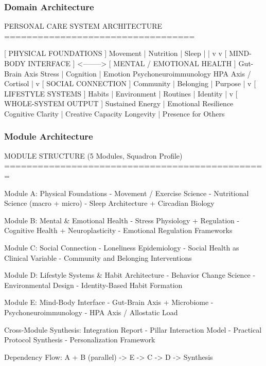 \documentclass[11pt,letterpaper]{article}
\begin{document}
\subsubsection{Domain Architecture}

\begin{asciibox}
PERSONAL CARE SYSTEM ARCHITECTURE
==================================

        [ PHYSICAL FOUNDATIONS ]
        Movement | Nutrition | Sleep
               |          |
               v          v
    [ MIND-BODY INTERFACE ] <--------> [ MENTAL / EMOTIONAL HEALTH ]
    Gut-Brain Axis                      Stress | Cognition | Emotion
    Psychoneuroimmunology
    HPA Axis / Cortisol
               |
               v
    [ SOCIAL CONNECTION ]
    Community | Belonging | Purpose
               |
               v
    [ LIFESTYLE SYSTEMS ]
    Habits | Environment | Routines | Identity
               |
               v
    [ WHOLE-SYSTEM OUTPUT ]
    Sustained Energy | Emotional Resilience
    Cognitive Clarity | Creative Capacity
    Longevity | Presence for Others
\end{asciibox}

\subsubsection{Module Architecture}

\begin{asciibox}
MODULE STRUCTURE (5 Modules, Squadron Profile)
===============================================

  Module A: Physical Foundations
    - Movement / Exercise Science
    - Nutritional Science (macro + micro)
    - Sleep Architecture + Circadian Biology

  Module B: Mental & Emotional Health
    - Stress Physiology + Regulation
    - Cognitive Health + Neuroplasticity
    - Emotional Regulation Frameworks

  Module C: Social Connection
    - Loneliness Epidemiology
    - Social Health as Clinical Variable
    - Community and Belonging Interventions

  Module D: Lifestyle Systems & Habit Architecture
    - Behavior Change Science
    - Environmental Design
    - Identity-Based Habit Formation

  Module E: Mind-Body Interface
    - Gut-Brain Axis + Microbiome
    - Psychoneuroimmunology
    - HPA Axis / Allostatic Load

  Cross-Module Synthesis: Integration Report
    - Pillar Interaction Model
    - Practical Protocol Synthesis
    - Personalization Framework

  Dependency Flow:
    A + B (parallel) -> E -> C -> D -> Synthesis
\end{asciibox}
\end{document}
